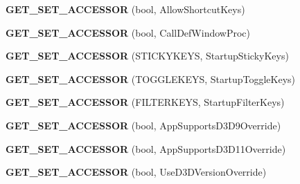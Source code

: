 \begin{DoxyCompactItemize}
\item 
\hypertarget{class_d_x_u_t_state_a06e20d8a4bcc8ebba013abd0a33fea39}{{\bfseries G\+E\+T\+\_\+\+S\+E\+T\+\_\+\+A\+C\+C\+E\+S\+S\+O\+R} (bool, Allow\+Shortcut\+Keys)}\label{class_d_x_u_t_state_a06e20d8a4bcc8ebba013abd0a33fea39}

\item 
\hypertarget{class_d_x_u_t_state_a88270222bc6d87a610b94309d35a5d4c}{{\bfseries G\+E\+T\+\_\+\+S\+E\+T\+\_\+\+A\+C\+C\+E\+S\+S\+O\+R} (bool, Call\+Def\+Window\+Proc)}\label{class_d_x_u_t_state_a88270222bc6d87a610b94309d35a5d4c}

\item 
\hypertarget{class_d_x_u_t_state_ad8ae97695fda015e78fcdf3538f368e7}{{\bfseries G\+E\+T\+\_\+\+S\+E\+T\+\_\+\+A\+C\+C\+E\+S\+S\+O\+R} (S\+T\+I\+C\+K\+Y\+K\+E\+Y\+S, Startup\+Sticky\+Keys)}\label{class_d_x_u_t_state_ad8ae97695fda015e78fcdf3538f368e7}

\item 
\hypertarget{class_d_x_u_t_state_a2a538af499891a9dca7af0a597c969a7}{{\bfseries G\+E\+T\+\_\+\+S\+E\+T\+\_\+\+A\+C\+C\+E\+S\+S\+O\+R} (T\+O\+G\+G\+L\+E\+K\+E\+Y\+S, Startup\+Toggle\+Keys)}\label{class_d_x_u_t_state_a2a538af499891a9dca7af0a597c969a7}

\item 
\hypertarget{class_d_x_u_t_state_adb16f4a32a8c334efa700d236c4b3f1f}{{\bfseries G\+E\+T\+\_\+\+S\+E\+T\+\_\+\+A\+C\+C\+E\+S\+S\+O\+R} (F\+I\+L\+T\+E\+R\+K\+E\+Y\+S, Startup\+Filter\+Keys)}\label{class_d_x_u_t_state_adb16f4a32a8c334efa700d236c4b3f1f}

\item 
\hypertarget{class_d_x_u_t_state_abb89be867248010d0afccf870fba31b5}{{\bfseries G\+E\+T\+\_\+\+S\+E\+T\+\_\+\+A\+C\+C\+E\+S\+S\+O\+R} (bool, App\+Supports\+D3\+D9\+Override)}\label{class_d_x_u_t_state_abb89be867248010d0afccf870fba31b5}

\item 
\hypertarget{class_d_x_u_t_state_a55ceafdcc4be50a189351cdd888eaff8}{{\bfseries G\+E\+T\+\_\+\+S\+E\+T\+\_\+\+A\+C\+C\+E\+S\+S\+O\+R} (bool, App\+Supports\+D3\+D11\+Override)}\label{class_d_x_u_t_state_a55ceafdcc4be50a189351cdd888eaff8}

\item 
\hypertarget{class_d_x_u_t_state_a168e648ecd6e44f8a0c57a6749440e6a}{{\bfseries G\+E\+T\+\_\+\+S\+E\+T\+\_\+\+A\+C\+C\+E\+S\+S\+O\+R} (bool, Use\+D3\+D\+Version\+Override)}\label{class_d_x_u_t_state_a168e648ecd6e44f8a0c57a6749440e6a}


\end{DoxyCompactItemize}
